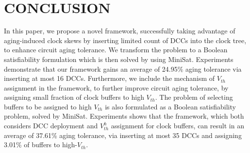 \section{CONCLUSION}
\label{sec:conclude}
In this paper, we propose a novel framework, successfully taking advantage of aging-induced clock skews by inserting limited count of DCCs into the clock tree, to enhance circuit aging tolerance. We transform the problem to a Boolean satisfiability formulation which is then solved by using MiniSat. Experiments demonstrate that our framework gains an average of 24.95\% aging tolerance via inserting at most 16 DCCs. Furthermore, we include the mechanism of $V_{th}$ assignment in the framework, to further improve circuit aging tolerance, by assigning small fraction of clock buffers to high $V_{th}$. The problem of selecting buffers to be assigned to high $V_{th}$ is also formulated as a Boolean satisfiability problem, solved by MiniSat. Experiments shows that the framework, which both considers DCC deployment and $V_{th}^h$ assignment for clock buffers, can result in an average of 37.61\% aging tolerance, via inserting at most 35 DCCs and assigning 3.01\% of buffers to high-$V_{th}$.


